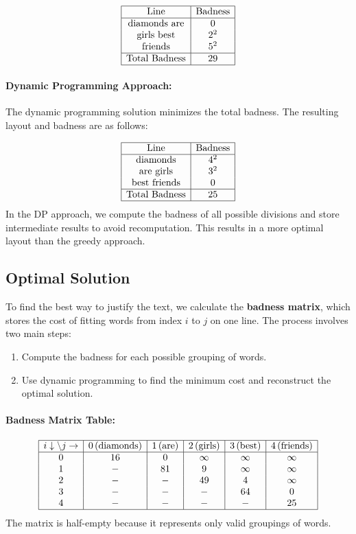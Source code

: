 \[
\begin{array}{|c|c|}
\hline
\text{Line} & \text{Badness} \\
\hline
\text{diamonds are} & 0 \\
\text{girls best} & 2^2 \\
\text{friends} & 5^2 \\
\hline
\text{Total Badness} & 29 \\
\hline
\end{array}
\]

\paragraph{Dynamic Programming Approach:}
The dynamic programming solution minimizes the total badness. The resulting layout and badness are as follows:

\[
\begin{array}{|c|c|}
\hline
\text{Line} & \text{Badness} \\
\hline
\text{diamonds} & 4^2 \\
\text{are girls} & 3^2 \\
\text{best friends} & 0 \\
\hline
\text{Total Badness} & 25 \\
\hline
\end{array}
\]
In the DP approach, we compute the badness of all possible divisions and store intermediate results to avoid recomputation. This results in a more optimal layout than the greedy approach.

\subsection{Optimal Solution}
To find the best way to justify the text, we calculate the \textbf{badness matrix}, which stores the cost of fitting words from index $i$ to $j$ on one line. The process involves two main steps:
\begin{enumerate}
    \item Compute the badness for each possible grouping of words.
    \item Use dynamic programming to find the minimum cost and reconstruct the optimal solution.
\end{enumerate}

\paragraph{Badness Matrix Table:}
\[
\begin{array}{|c|c|c|c|c|c|}
\hline
i \downarrow \backslash j \rightarrow & 0 \, (\text{diamonds}) & 1 \, (\text{are}) & 2 \, (\text{girls}) & 3 \, (\text{best}) & 4 \, (\text{friends}) \\
\hline
0 & 16 & 0 & \infty & \infty & \infty \\
1 & - & 81 & 9 & \infty & \infty \\
2 & - & - & 49 & 4 & \infty \\
3 & - & - & - & 64 & 0 \\
4 & - & - & - & - & 25 \\
\hline
\end{array}
\]
The matrix is half-empty because it represents only valid groupings of words.

